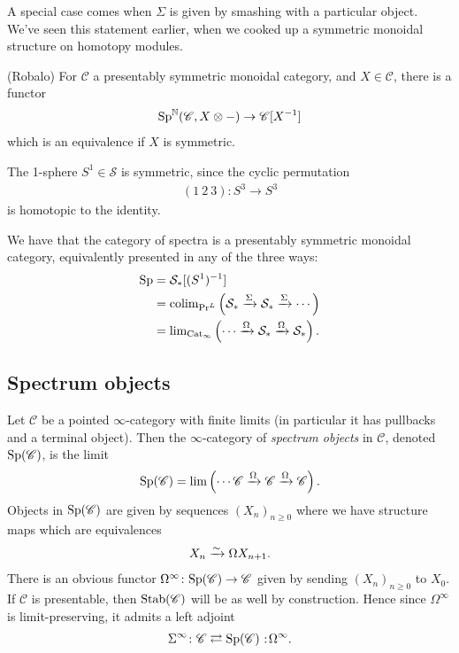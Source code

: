 \documentclass[11pt,openany]{book}
\begin{document}
A special case comes when $\Sigma$ is given by smashing with a particular object. We've seen this statement earlier, when we cooked up a symmetric monoidal structure on homotopy modules.

\begin{theorem} (Robalo) For $\mathscr{C}$ a presentably symmetric monoidal category, and $X \in \mathscr{C}$, there is a functor
\begin{align*}
    \mathrm{Sp}^\mathbb{N}(\mathscr{C}, X \otimes -) \to \mathscr{C}[X^{-1}]
\end{align*}
which is an equivalence if $X$ is symmetric.
\end{theorem}

\begin{example} The 1-sphere $S^1 \in \mathcal{S}$ is symmetric, since the cyclic permutation
\begin{align*}
    (1\ 2\ 3) \colon S^3 \to S^3
\end{align*}
is homotopic to the identity.
\end{example}

\begin{corollary} We have that the category of spectra is a presentably symmetric monoidal category, equivalently presented in any of the three ways:
\begin{align*}
    \mathrm{Sp} &= \mathcal{S}_\ast[(S^1)^{-1}] \\
    &= \mathrm{colim}_{\mathrm{Pr}^L} \left( \mathcal{S}_\ast \xrightarrow{\Sigma} \mathcal{S}_\ast \xrightarrow{\Sigma} \cdots \right) \\
    &= \text{lim}_{\mathrm{Cat}_\infty} \left( \cdots \xrightarrow{\Omega} \mathcal{S}_\ast \xrightarrow{\Omega} \mathcal{S}_\ast \right).
\end{align*}
\end{corollary}



\subsection{Spectrum objects}

Let $\mathscr{C}$ be a pointed $\infty$-category with finite limits (in particular it has pullbacks and a terminal object). Then the $\infty$-category of \textit{spectrum objects} in $\mathscr{C}$, denoted $\mathrm{Sp}(\mathscr{C})$, is the limit
\begin{align*}
    \mathrm{Sp}(\mathscr{C}) = \lim \left( \cdots \mathscr{C} \xrightarrow{\Omega} \mathscr{C} \xrightarrow{\Omega} \mathscr{C} \right).
\end{align*}
%
Objects in $\mathrm{Sp}(\mathscr{C})$ are given by sequences $(X_n)_{n\ge0}$ where we have structure maps which are equivalences
\begin{align*}
    X_n \xrightarrow{\sim} \Omega X_{n+1}.
\end{align*}
%
There is an obvious functor $\Omega^\infty \colon\mathrm{Sp}(\mathscr{C}) \to \mathscr{C}$ given by sending $(X_n)_{n\ge0}$ to $X_0$. If $\mathscr{C}$ is presentable, then $\mathrm{Stab}(\mathscr{C})$ will be as well by construction. Hence since $\Omega^\infty$ is limit-preserving, it admits a left adjoint
\begin{align*}
    \Sigma^\infty \colon \mathscr{C} \rightleftarrows \Sp(\mathscr{C}) \noloc \Omega^\infty.
\end{align*}
%
\end{document}

